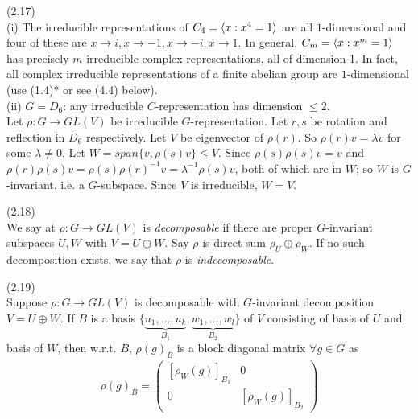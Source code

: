 \documentclass[a4paper]{article}
\begin{document}
\begin{eg} (2.17)\\
(i) The irreducible representations of $C_4=\langle x:x^4=1\rangle$ are all $1$-dimensional and four of these are $x\to i,x \to -1, x \to -i, x \to 1$. In general, $C_m=\langle x:x^m=1\rangle$ has precisely $m$ irreducible complex representations, all of dimension 1. In fact, all complex irreducible representations of a finite abelian group are $1$-dimensional (use (1.4)* or see (4.4) below).\\
(ii) $G=D_6$: any irreducible $C$-representation has dimension $\leq 2$.\\
Let $\rho:G \to GL(V)$ be irreducible $G$-representation. Let $r,s$ be rotation and reflection in $D_6$ respectively. Let $V$ be eigenvector of $\rho(r)$. So $\rho(r) v = \lambda v$ for some $\lambda \neq 0$. Let $W=span\{v,\rho(s)v\} \leq V$. Since $\rho(s)\rho(s)v = v$ and $\rho(r)\rho(s) v = \rho(s)\rho(r)^{-1} v = \lambda^{-1} \rho(s) v$, both of which are in $W$; so $W$ is $G$-invariant, i.e. a $G$-subspace. Since $V$ is irreducible, $W=V$.
\end{eg}

\begin{defi} (2.18)\\
We say at $\rho:G \to GL(V)$ is \emph{decomposable} if there are proper $G$-invariant subspaces $U,W$ with $V = U \oplus W$. Say $\rho$ is direct sum $\rho_U \oplus \rho_W$. If no such decomposition exists, we say that $\rho$ is \emph{indecomposable}.
\end{defi}

\begin{lemma} (2.19)\\
Suppose $\rho:G \to GL(V)$ is decomposable with $G$-invariant decomposition $V=U \oplus W$. If $B$ is a basis $\{\underbrace{u_1,...,u_k}_{B_1}, \underbrace{w_1,...,w_l}_{B_2}\}$ of $V$ consisting of basis of $U$ and basis of $W$, then w.r.t. $B$, $\rho(g)_B$ is a block diagonal matrix $\forall g\in G$ as 
\begin{equation*}
\begin{aligned}
\rho(g)_B = \begin{pmatrix}
[\rho_W(g)]_{B_1} & 0\\
0 & [\rho_W(g)]_{B_2}
\end{pmatrix}
\end{aligned}
\end{equation*}
\end{lemma}
\end{document}
